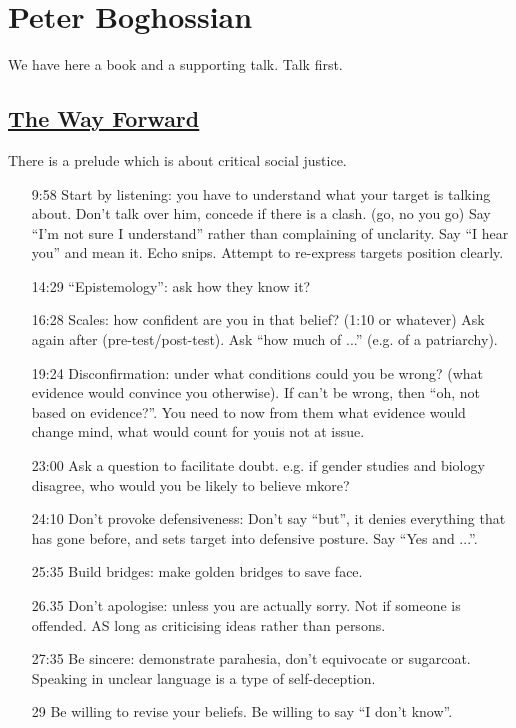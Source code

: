 \documentclass[10pt,titlepage]{book}
\begin{document}
\section{Peter Boghossian}

We have here a book and a supporting talk.
Talk first.

\subsection{\href{https://www.youtube.com/watch?v=LiymUd9FjHA}{The Way Forward}}

There is a prelude which is about critical social justice.

\begin{itemize}
\item[9:58] Start by listening: you have to understand what your target is talking about.
  Don't talk over him, concede if there is a clash. (go, no you go)
  Say ``I'm not sure I understand'' rather than complaining of unclarity.
  Say ``I hear you'' and mean it.
  Echo snips.
  Attempt to re-express targets position clearly.
\item[14:29] ``Epistemology'': ask how they know it?
\item[16:28] Scales: how confident are you in that belief? (1:10 or whatever)
  Ask again after (pre-test/post-test).
  Ask ``how much of ...'' (e.g. of a patriarchy).
\item[19:24] Disconfirmation: under what conditions could you be wrong?
  (what evidence would convince you otherwise).
  If can't be wrong, then ``oh, not based on evidence?''.
  You need to now from them what evidence would change mind, what would count for youis not at issue.
\item[23:00] Ask a question to facilitate doubt.
  e.g. if gender studies and biology disagree, who would you be likely to believe mkore?
\item[24:10] Don't provoke defensiveness: Don't say ``but'', it denies everything that has gone before, and sets target into defensive posture.
  Say ``Yes and ...''.
\item[25:35] Build bridges: make golden bridges to save face.
\item[26.35] Don't apologise: unless you are actually sorry. Not if someone is offended.  AS long as criticising ideas rather than persons.
\item[27:35] Be sincere: demonstrate parahesia, don't equivocate or sugarcoat.
  Speaking in unclear language is a type of self-deception.
  \item[29] Be willing to revise your beliefs.  Be willing to say ``I don't know''.
\end{itemize}
\end{document}
